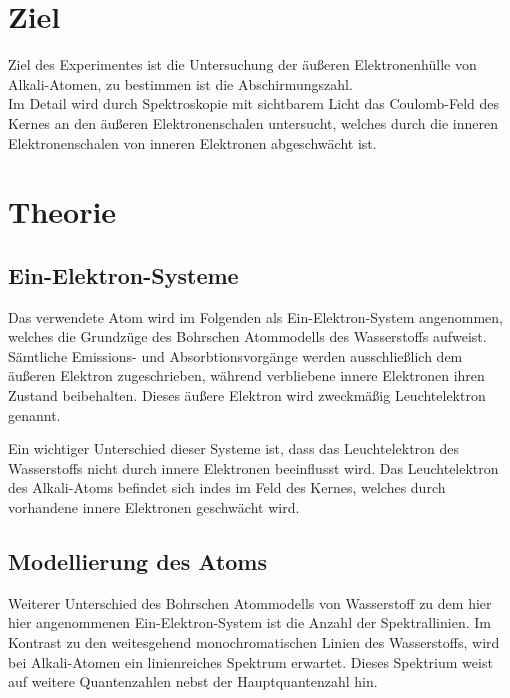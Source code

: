 \section*{Ziel}
Ziel des Experimentes ist die Untersuchung der äußeren Elektronenhülle von Alkali-Atomen, zu bestimmen ist die Abschirmungszahl.\\
Im Detail wird durch Spektroskopie mit sichtbarem Licht das Coulomb-Feld des Kernes an den äußeren Elektronenschalen untersucht,
welches durch die inneren Elektronenschalen von inneren Elektronen abgeschwächt ist.

\section{Theorie}
\label{sec:Theorie}
\subsection{Ein-Elektron-Systeme} %
\label{sub:1e}
Das verwendete Atom wird im Folgenden als Ein-Elektron-System angenommen, welches die Grundzüge des Bohrschen Atommodells des Wasserstoffs aufweist.
Sämtliche Emissions- und Absorbtionsvorgänge werden ausschließlich dem äußeren Elektron zugeschrieben, während verbliebene innere Elektronen ihren Zustand beibehalten.
Dieses äußere Elektron wird zweckmäßig Leuchtelektron genannt.

Ein wichtiger Unterschied dieser Systeme ist, dass das Leuchtelektron des Wasserstoffs nicht durch innere Elektronen beeinflusst wird.
Das Leuchtelektron des Alkali-Atoms befindet sich indes im Feld des Kernes, welches durch vorhandene innere Elektronen geschwächt wird.

\subsection{Modellierung des Atoms} %
\label{sub:L_quantenzahl}
Weiterer Unterschied des Bohrschen Atommodells von Wasserstoff zu dem hier hier angenommenen Ein-Elektron-System ist die Anzahl der Spektrallinien. 
Im Kontrast zu den weitesgehend monochromatischen Linien des Wasserstoffs, wird bei Alkali-Atomen ein linienreiches Spektrum erwartet.
Dieses Spektrium weist auf weitere Quantenzahlen nebst der Hauptquantenzahl hin.

